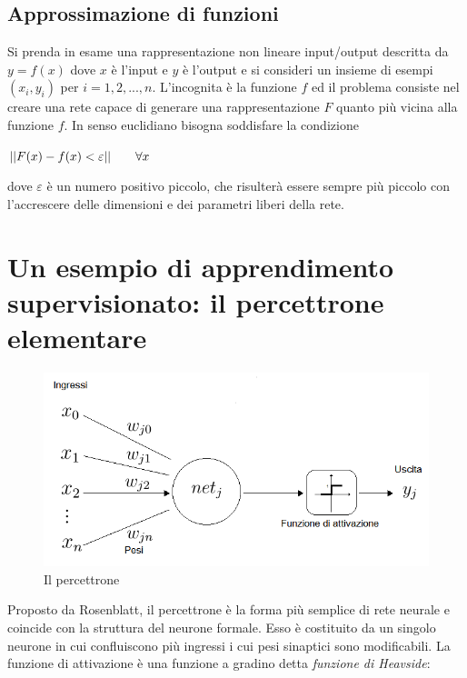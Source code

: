 \documentclass[12pt,a4paper,oneside]{book}
\begin{document}
		\subsection{Approssimazione di funzioni}
		
		Si prenda in esame una rappresentazione non lineare input/output descritta da $y=f(x)$ dove $x$ è l'input e $y$ è l'output e si consideri un insieme di esempi ${(x_{i},y_{i} )}$ per $i=1, 2, ..., n$. L'incognita è la funzione $f$ ed il problema consiste nel creare una rete capace di generare una rappresentazione $F$ quanto più vicina alla funzione $f$. In senso euclidiano bisogna soddisfare la condizione\\
		
		\begin{center} $ ||F(x)-f(x)<\varepsilon|| \hspace{0,7cm} \forall x $ \end{center}
		
		dove $\varepsilon$ è un numero positivo piccolo, che risulterà essere sempre più piccolo con l'accrescere delle dimensioni e dei parametri liberi della rete. 
		
	
		
	\section{Un esempio di apprendimento supervisionato: il percettrone elementare}
	
		\begin{figure}[h]
			\centering
			\includegraphics[width=0.7\linewidth]{IMMAGINI/perceptron}
			\caption{ Il percettrone }
			\label{fig:perceptron}
		\end{figure}	
	
		Proposto da Rosenblatt, il percettrone è la forma più semplice di rete neurale e coincide con la struttura del neurone formale. Esso è costituito da un singolo neurone in cui confluiscono più ingressi i cui pesi sinaptici sono modificabili. 
		\clearpage
		La funzione di attivazione è una funzione a gradino detta \emph{funzione di Heavside}:
		
\end{document}
